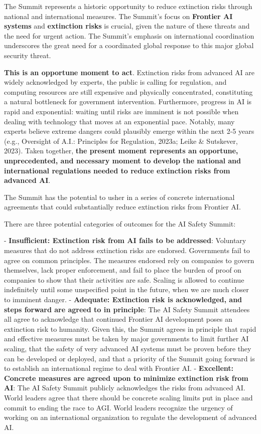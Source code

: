 \documentclass[12pt,a4paper]{article}
\begin{document}
The Summit represents a historic opportunity to reduce extinction risks through national and international measures. The Summit’s focus on \textbf{Frontier AI systems} and \textbf{extinction risks} is crucial, given the nature of these threats and the need for urgent action. The Summit’s emphasis on international coordination underscores the great need for a coordinated global response to this major global security threat.

\textbf{This is an opportune moment to act}. Extinction risks from advanced AI are widely acknowledged by experts, the public is calling for regulation, and computing resources are still expensive and physically concentrated, constituting a natural bottleneck for government intervention. Furthermore, progress in AI is rapid and exponential: waiting until risks are imminent is not possible when dealing with technology that moves at an exponential pace. Notably, many experts believe extreme dangers could plausibly emerge within the next 2-5 years (e.g., Oversight of A.I.: Principles for Regulation, 2023a; Leike \& Sutskever, 2023). Taken together, \textbf{the present moment represents an opportune, unprecedented, and necessary moment to develop the national and international regulations needed to reduce extinction risks from advanced AI}. 

The Summit has the potential to usher in a series of concrete international agreements that could substantially reduce extinction risks from Frontier AI. 

There are three potential categories of outcomes for the AI Safety Summit:

-  \textbf{Insufficient: Extinction risk from AI fails to be addressed}: Voluntary measures that do not address extinction risks are endorsed. Governments fail to agree on common principles. The measures endorsed rely on companies to govern themselves, lack proper enforcement, and fail to place the burden of proof on companies to show that their activities are safe. Scaling is allowed to continue indefinitely until some unspecified point in the future, when we are much closer to imminent danger.
-  \textbf{\textbf{Adequate:} Extinction risk is acknowledged, and steps forward are agreed to in principle}: The AI Safety Summit attendees all agree to acknowledge that continued Frontier AI development poses an extinction risk to humanity. Given this, the Summit agrees in principle that rapid and effective measures must be taken by major governments to limit further AI scaling, that the safety of very advanced AI systems must be proven before they can be developed or deployed, and that a priority of the Summit going forward is to establish an international regime to deal with Frontier AI.
- \textbf{Excellent:} \textbf{Concrete measures are agreed upon to minimize extinction risk from AI}: The AI Safety Summit publicly acknowledges the risks from advanced AI. World leaders agree that there should be concrete scaling limits put in place and commit to ending the race to AGI. World leaders recognize the urgency of working on an international organization to regulate the development of advanced AI.
\end{document}
